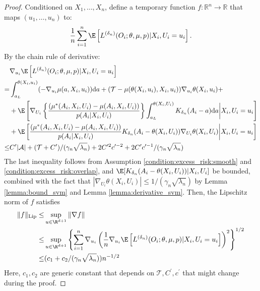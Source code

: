 \begin{proof}
\noindent Conditioned on $X_1,\ldots, X_n$, define a temporary function $f: \mathbb{R}^n \to \mathbb{R}$ that maps $(u_1, \dots, u_n)$ to:
$$\frac{1}{n}\sum_{i=1}^n \E\left[L^{({\delta_n})}(O_i;\theta,\mu, p)|X_i,U_i = u_i\right].$$
By the chain rule of derivative:
\begin{align*}
    &\nabla_{u_i} \E\left[L^{({\delta_n})}(O_i;\theta,\mu, p)|X_i,U_i = u_i\right]\\
    = & \int_{a_L}^{\theta(X_i,u_i)}(-\nabla_{u_i}\mu(a,X_i,u_i))\mathrm{d}a + (\mathcal{T}-\mu(\theta(X_i,u_i),X_i,u_i))\nabla_{u_i}\theta(X_i,u_i)+\\
    & +
 \E\left[\nabla_{U_i}\left\{\frac{(\mu^*(A_i,X_i,U_i) - \mu(A_i,X_i,U_i))}{ p(A_{i}|X_{i},U_{i})}\right\} \int_{a_L}^{\theta(X_i,U_i)}K_{\delta_n}(A_i-a)\mathrm{d}a\bigg|X_i,U_i = u_i\right]\\
    & + \E\left[\frac{(\mu^*(A_i,X_i,U_i) - \mu(A_i,X_i,U_i))}{ p(A_{i}|X_{i},U_{i})}K_{\delta_n}(A_i-\theta(X_i,U_i))\nabla_{U_i}\theta(X_i,U_i)\bigg|X_i,U_i = u_i\right]\\
    \leq & C^\prime|\mathcal{A}| + (\mathcal{T}+C^\prime)/(\gamma_n\sqrt{\lambda_n}) + 2C^{\prime2} c^{\prime-2} + 2C^\prime c^{\prime-1}/(\gamma_n\sqrt{\lambda_n})
\end{align*}
The last inequality follows from Assumption \ref{condition:excess_risk:smooth} and \ref{condition:excess_risk:overlap}, and $\E[K_{\delta_n}(A_i - \theta(X_i,U_i))|X_i,U_i]$ be bounded, combined with the fact that $|\nabla_{U_i}\theta(X_i,U_i)|\leq 1/(\gamma_n\sqrt{\lambda_n})$ by Lemma \ref{lemma:bound_svm} and Lemma \ref{lemma:derivative_svm}.
Then, the Lipschitz norm of $f$ satisfies 
\begin{align*}
    \|f\|_{\text{Lip}}\leq & \sup_{u\in\R^{d+1}}\|\nabla f\|\\
    \leq& \sup_{u\in\R^{d+1}}\left\{\sum_{i=1}^n \nabla_{u_i}\left(\frac{1}{n}\nabla_{u_i} \E\left[L^{({\delta_n})}(O_i;\theta,\mu, p)|X_i,U_i = u_i\right]\right)^2\right\}^{1/2}\\
    \leq & (c_1 + c_2/(\gamma_n\sqrt{\lambda_n}))n^{-1/2}
\end{align*}
Here, $c_1,c_2$ are generic constant that depends on $\mathcal{T},C^\prime,c^\prime$ that might change during the proof.


\end{proof}
